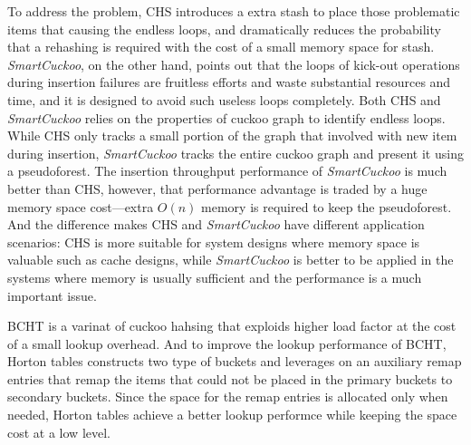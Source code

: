 \documentclass[12pt,conference,compsoc]{IEEEtran}
\begin{document}
To address the problem, CHS introduces a extra stash to place those problematic items that causing the endless loops, and dramatically reduces the probability that a rehashing is required with the cost of a small memory space for stash. \textit{SmartCuckoo}, on the other hand, points out that the loops of kick-out operations during insertion failures are fruitless efforts and waste substantial resources and time, and it is designed to avoid such useless loops completely. Both CHS and \textit{SmartCuckoo} relies on the properties of cuckoo graph to identify endless loops. While CHS only tracks a small portion of the graph that involved with new item during insertion, \textit{SmartCuckoo} tracks the entire cuckoo graph and present it using a pseudoforest. The insertion throughput performance of \textit{SmartCuckoo} is much better than CHS, however, that performance advantage is traded by a huge memory space cost---extra $O(n)$ memory is required to keep the pseudoforest. And the difference makes CHS and \textit{SmartCuckoo} have different application scenarios: CHS is more suitable for system designs where memory space is valuable such as cache designs, while \textit{SmartCuckoo} is better to be applied in the systems where memory is usually sufficient and the performance is a much important issue.

BCHT is a varinat of cuckoo hahsing that exploids higher load factor at the cost of a small lookup overhead. And to improve the lookup performance of BCHT, Horton tables constructs two type of buckets and leverages on an auxiliary remap entries that remap the items that could not be placed in the primary buckets to secondary buckets. Since the space for the remap entries is allocated only when needed, Horton tables achieve a better lookup performce while keeping the space cost at a low level.

\footnotesize{


}
\end{document}
